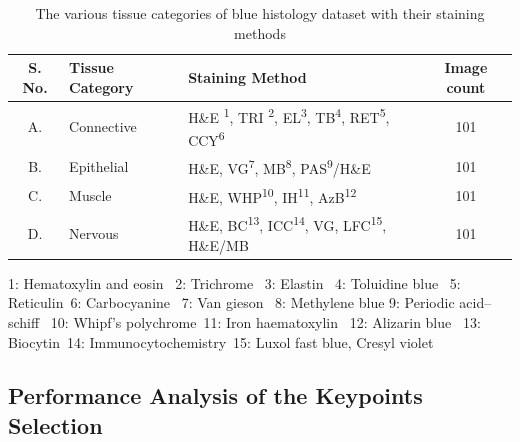 \begin{itemize}
\begin{table}[h]
\caption[The different categories of histology image dataset and their staining methods]{\fontsize{10}{12}\selectfont The various tissue categories of blue histology dataset with  their staining methods}
\label{ch3:tab:tissued}
\centering
\footnotesize
\renewcommand{\arraystretch}{1.5}
\begin{tabular}{ c p{1.4in} l c}
\hline
\textbf{S. No.}    &    \textbf{Tissue Category}    &    \textbf{Staining Method}    &\textbf{    Image count}    \\
\hline
A.    &    Connective   &    H\&E \textsuperscript{1}, TRI \textsuperscript{2}, EL\textsuperscript{3}, TB\textsuperscript{4}, RET\textsuperscript{5}, CCY\textsuperscript{6}    &    101    \\    B.    &    Epithelial     &    H\&E, VG\textsuperscript{7}, MB\textsuperscript{8}, PAS\textsuperscript{9}/H\&E    &    101    \\
C.    &    Muscle     &    H\&E, WHP\textsuperscript{10}, IH\textsuperscript{11}, AzB\textsuperscript{12}&    101    \\
D.    &    Nervous     &    H\&E, BC\textsuperscript{13}, ICC\textsuperscript{14}, VG, LFC\textsuperscript{15}, H\&E/MB    &    101    \\ 
\hline

\end{tabular}


{\scriptsize
 1: Hematoxylin and eosin  \ 2: Trichrome \ 3: Elastin \ 4: Toluidine blue \ 5: Reticulin\ 6: Carbocyanine \ 7: Van gieson \ 8: Methylene blue  9: Periodic acid–schiff 
\ 10: Whipf's polychrome\ 11: Iron haematoxylin \ 12: Alizarin blue
\ 13: Biocytin\ 14: Immunocytochemistry\ 15: Luxol fast blue, Cresyl violet}
\end{table}
\end{itemize}


\subsection{Performance Analysis of the Keypoints Selection} \label{subsec:1}

